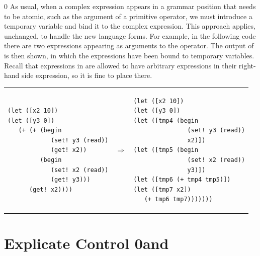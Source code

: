 \documentclass[7x10]{TimesAPriori_MIT}%
\def\racketEd{0}
\def\edition{0}
\newcommand{\racket}[1]{{\if\edition\racketEd{#1}\fi}}
\numberwithin{theorem}{chapter}
\numberwithin{definition}{chapter}
\numberwithin{equation}{chapter}
\begin{document}
{\if\edition\racketEd    
%
As usual, when a complex expression appears in a grammar position that
needs to be atomic, such as the argument of a primitive operator, we
must introduce a temporary variable and bind it to the complex
expression.  This approach applies, unchanged, to handle the new
language forms.  For example, in the following code there are two
 expressions appearing as arguments to the \code{+}
operator.  The output of  is then shown, in which the
 expressions have been bound to temporary
variables. Recall that  expressions in \LangLoopANF{} are
allowed to have arbitrary expressions in their right-hand side
expression, so it is fine to place  there.
%
\begin{center}
\begin{tabular}{lcl}
\begin{minipage}{0.4\textwidth}
\begin{lstlisting}
(let ([x2 10])
(let ([y3 0])
   (+ (+ (begin 
            (set! y3 (read))
            (get! x2))
         (begin 
            (set! x2 (read))
            (get! y3)))
      (get! x2))))
\end{lstlisting}
\end{minipage}
&
$\Rightarrow$
&
\begin{minipage}{0.4\textwidth}
\begin{lstlisting}  
(let ([x2 10])
(let ([y3 0])
(let ([tmp4 (begin 
               (set! y3 (read))
               x2)])
(let ([tmp5 (begin 
               (set! x2 (read))
               y3)])
(let ([tmp6 (+ tmp4 tmp5)])
(let ([tmp7 x2])
   (+ tmp6 tmp7)))))))
\end{lstlisting}
\end{minipage}
\end{tabular}
\end{center}

\fi}

\section{Explicate Control \racket{and \LangCLoop{}}}
\label{sec:explicate-loop}

\newcommand{\CloopASTRacket}{
\begin{array}{lcl}
\Atm  &::=&  \VOID \\
\Stmt &::=& \READ{}
\end{array}
}
\end{document}
